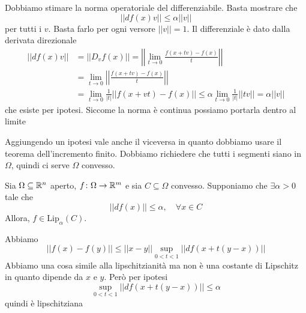 \documentclass[a4paper]{article}
\begin{document}
\begin{radioactive}
\begin{snippetproof}{}
    Dobbiamo stimare la norma operatoriale del differenziabile.
    Basta mostrare che 
    \[
    ||df(x)v|| \leq \alpha||v||
    \]
    per tutti i \(v\). Basta farlo per ogni versore \(||v||=1\).
    Il differenziale è dato dalla derivata direzionale
    \begin{align*}
        ||df(x)v|| &= ||D_v f(x)||
        = \left|\left|
            \lim_{t \to 0} \frac{f(x + tv) - f(x)}{t}
        \right|\right| \\
        &= \lim_{t\to 0} \left|\left|
            \frac{f(x + tv) - f(x)}{t}
        \right|\right| \\
        &= \lim_{t\to 0} \frac{1}{|t|}
        ||f(x + vt) - f(x)|| \leq \alpha \lim_{t \to 0} \frac{1}{|t|}
        ||tv|| = \alpha ||v||
    \end{align*}
    che esiste per ipotesi. Siccome la norma è continua possiamo portarla dentro al limite
\end{snippetproof}
\end{radioactive}

\begin{radioactive}
Aggiungendo un ipotesi vale anche il viceversa in quanto
dobbiamo usare il teorema dell'incremento finito.
Dobbiamo richiedere che tutti i segmenti siano in \(\Omega\),
quindi ci serve \(\Omega\) convesso.

\begin{snippetproposition}{}
    Sia \(\Omega \subseteq \mathbb{R}^n\) aperto, \(f \colon \Omega \to \mathbb{R}^m\)
    e sia \(C \subseteq \Omega\) convesso.
    Supponiamo che \(\exists \alpha > 0\)
    tale che
    \[
        ||df(x)|| \leq \alpha, \quad \forall x \in C
    \]
    Allora, \(f \in \text{Lip}_\alpha(C)\).
\end{snippetproposition}
\end{radioactive}

\begin{radioactive}
\begin{snippetproof}{}
    Abbiamo
    \[
        ||f(x)-f(y)|| \leq ||x-y|| \sup_{0 < t < 1} || df(x + t(y-x)) ||
    \]
    Abbiamo una cosa simile alla lipschitzianità
    ma non è una costante di Lipschitz in quanto dipende da \(x\) e \(y\).
    Però per ipotesi
    \[
        \sup_{0 < t < 1} ||df(x + t(y-x))|| \leq \alpha 
    \]
    quindi è lipschitziana    
\end{snippetproof}
\end{radioactive}
\end{document}
